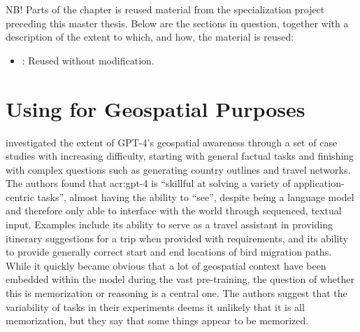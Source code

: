 \begin{comment}
Note that a reference needs to be complete: you should always give the full name of a conference or journal,
always include page numbers, always say where a book or thesis was published, and where a conference took place, as further described in Section~\ref{sec:reference_list}.

Just as described in the Background chapter (Chapter~\ref{cha:background_theory}), it is possible (and even likely) that you will want to reuse some of the text that you have written for your specialisation project in your Master's Thesis.
This is allowed, as long as it is clearly stated what you have reused and in what form (e.g., if a section is a straight-forward copy, if it has undergone only editorial changes, if it contains some old material but also some new, etc.).
\end{comment}

\begin{itshape}
    NB! Parts of the  chapter is reused material from the specialization project \citep{holmLLMsDeathGIS2023} preceding this master thesis. Below are the sections in question, together with a description of the extent to which, and how, the material is reused:

    \begin{itemize}
        \item {}: Reused without modification.
    \end{itemize}
\end{itshape}


\section[Using LLMs for Geospatial Purposes]{Using  for Geospatial Purposes}
\label{sec:llm-gis}

\cite{robertsGPT4GEOHowLanguage2023} investigated the extent of GPT-4's geospatial awareness through a set of case studies with increasing difficulty, starting with general factual tasks and finishing with complex questions such as generating country outlines and travel networks. The authors found that \acrshort{acr:gpt}-4 is \enquote{skillful at solving a variety of application-centric tasks}, almost having the ability to \enquote{see}, despite being a language model and therefore only able to interface with the world through sequenced, textual input. Examples include its ability to serve as a travel assistant in providing itinerary suggestions for a trip when provided with requirements, and its ability to provide generally correct start and end locations of bird migration paths. While it quickly became obvious that a lot of geospatial context have been embedded within the model during the vast pre-training, the question of whether this is memorization or reasoning is a central one. The authors suggest that the variability of tasks in their experiments deems it unlikely that it is all memorization, but they say that some things appear to be memorized.

